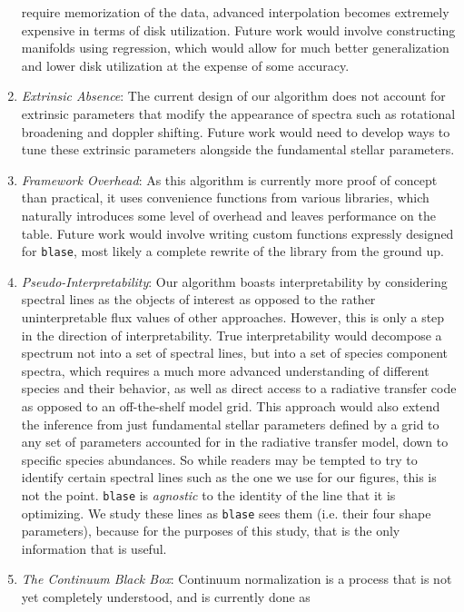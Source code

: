 \documentclass[twocolumn]{aastex631}
\begin{document}
\begin{enumerate}[label=-]
    require memorization of the data, advanced interpolation becomes extremely
    expensive in terms of disk utilization. Future work would involve 
    constructing manifolds using regression, which would allow for much
    better generalization and lower disk utilization at the expense of
    some accuracy.
    \item \textit{Extrinsic Absence}: The current design of our algorithm
    does not account for extrinsic parameters that modify the appearance of 
    spectra such as rotational broadening and doppler shifting. Future work
    would need to develop ways to tune these extrinsic parameters alongside
    the fundamental stellar parameters.
    \item \textit{Framework Overhead}: As this algorithm is currently more 
    proof of concept than practical, it uses convenience functions from 
    various libraries, which naturally introduces some level of overhead and 
    leaves performance on the table. Future work would involve writing 
    custom functions expressly designed for \texttt{blase}, most likely a 
    complete rewrite of the library from the ground up.
    \item \textit{Pseudo-Interpretability}: Our algorithm boasts interpretability
    by considering spectral lines as the objects of interest as opposed to 
    the rather uninterpretable flux values of other approaches. However, this
    is only a step in the direction of interpretability. True interpretability
    would decompose a spectrum not into a set of spectral lines, but into a
    set of species component spectra, which requires a much more advanced 
    understanding of different species and their behavior, as well as
    direct access to a radiative transfer code as opposed to an off-the-shelf
    model grid. This approach would also extend the inference from just
    fundamental stellar parameters defined by a grid to any set of parameters
    accounted for in the radiative transfer model, down to specific species
    abundances. So while readers may be tempted to try to identify certain 
    spectral lines such as the one we use for our figures, this is not 
    the point. \texttt{blase} is \textit{agnostic} to the identity of the line
    that it is optimizing. We study these lines as \texttt{blase} sees them
    (i.e. their four shape parameters), because for the purposes of this study, 
    that is the only information that is useful.
    \item \textit{The Continuum Black Box}: Continuum normalization is a
    process that is not yet completely understood, and is currently done as 

\end{enumerate}
\end{document}
